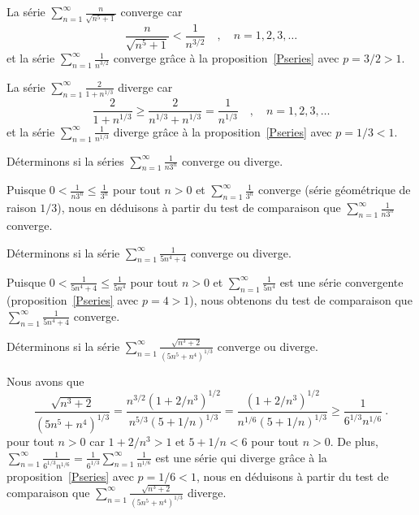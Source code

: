 {\begin{egg}
La série $\displaystyle \sum_{n=1}^\infty \frac{n}{\sqrt{n^5+1}}$
converge car
\[
\frac{n}{\sqrt{n^5+1}} < \frac{1}{n^{3/2}} \quad , \quad n=1,2,3,\ldots
\]
et la série $\displaystyle \sum_{n=1}^\infty \frac{1}{n^{3/2}}$
converge grâce à la proposition~\ref{Pseries} avec $p = 3/2 > 1$.

La série $\displaystyle \sum_{n=1}^\infty \frac{2}{1+n^{1/3}}$ diverge car
\[
\frac{2}{1+n^{1/3}} \geq \frac{2}{n^{1/3}+n^{1/3}} =\frac{1}{n^{1/3}}
\quad , \quad n=1, 2, 3,\ldots
\]
et la série $\displaystyle \sum_{n=1}^\infty \frac{1}{n^{1/3}}$ diverge grâce
à la proposition~\ref{Pseries} avec $p =1/3 < 1$.
\end{egg}

\begin{egg}
Déterminons si la séries $\displaystyle \sum_{n=1}^\infty \frac{1}{n 3^n}$
converge ou diverge.

Puisque $\displaystyle 0 < \frac{1}{n 3^n} \leq \frac{1}{3^n}$
pour tout $n>0$ et $\displaystyle \sum_{n=1}^\infty \frac{1}{3^n}$
converge (série géométrique de raison $1/3$), nous en déduisons à partir du
test de comparaison que $\displaystyle \sum_{n=1}^\infty \frac{1}{n 3^n}$
converge.
\end{egg}

\begin{egg}
Déterminons si la série $\displaystyle \sum_{n=1}^\infty \frac{1}{5n^4 + 4}$
converge ou diverge.

Puisque $\displaystyle 0 < \frac{1}{5n^4 + 4} \leq \frac{1}{5n^4}$ pour
tout $n>0$ et $\displaystyle \sum_{n=1}^\infty \frac{1}{5n^4}$
est une série convergente (proposition~\ref{Pseries} avec $p = 4>1$), nous
obtenons du test de comparaison que
$\displaystyle \sum_{n=1}^\infty \frac{1}{5n^4 + 4}$ converge.
\end{egg}

\begin{egg}
Déterminons si la série
$\displaystyle \sum_{n=1}^\infty \frac{\sqrt{n^3+2}}{(5n^5+n^4)^{1/3}}$
converge ou diverge.

Nous avons que
\[
\frac{\sqrt{n^3+2}}{(5n^5+n^4)^{1/3}}
= \frac{n^{3/2}(1+2/n^3)^{1/2}}{n^{5/3}(5+1/n)^{1/3}}
= \frac{(1+2/n^3)^{1/2}}{n^{1/6}(5+1/n)^{1/3}}
\geq \frac{1}{6^{1/3} n^{1/6}} \ .
\]
pour tout $n>0$ car $1 + 2/n^3 > 1$ et $5+1/n < 6$ pour tout $n>0$.
De plus, $\displaystyle \sum_{n=1}^\infty \frac{1}{6^{1/3} n^{1/6}}
= \frac{1}{6^{1/3}} \sum_{n=1}^\infty \frac{1}{n^{1/6}}$
est une série qui diverge grâce à la proposition~\ref{Pseries} avec
$p=1/6 <1$, nous en
déduisons à partir du test de comparaison que
$\displaystyle \sum_{n=1}^\infty \frac{\sqrt{n^3+2}}{(5n^5+n^4)^{1/3}}$
diverge.
\end{egg}

}

